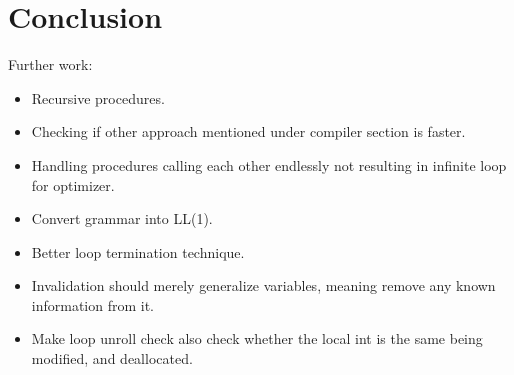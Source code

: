 \section{Conclusion \ms}
Further work:
\begin{itemize}
    \item Recursive procedures.
    \item Checking if other approach mentioned under compiler section is faster.
    \item Handling procedures calling each other endlessly not resulting in infinite loop
          for optimizer.
    \item Convert grammar into LL(1).
    \item Better loop termination technique.
    \item Invalidation should merely generalize variables, meaning remove any known information
          from it.
    \item Make loop unroll check also check whether the local int is the same being modified,
          and deallocated.
\end{itemize}